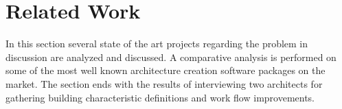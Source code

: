 \chapter{Related Work}


In this section several state of the art projects regarding the problem in discussion are analyzed and discussed. 
A comparative analysis is performed on some of the most well known architecture creation software packages on the market.
The section ends with the results of interviewing two architects for gathering building characteristic definitions and
work flow improvements.






